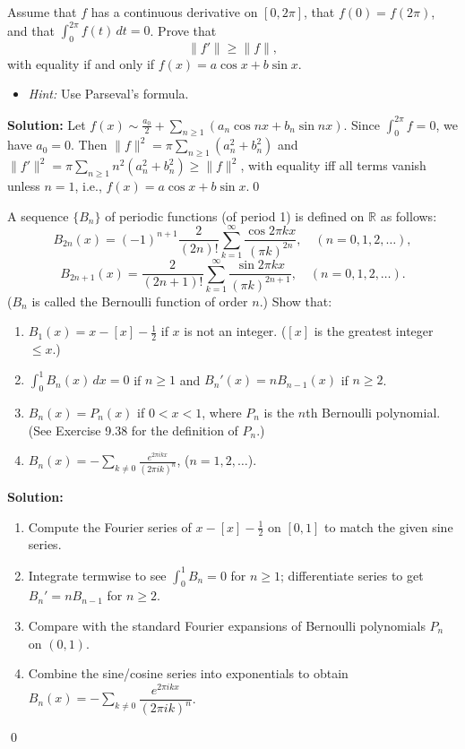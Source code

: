 \begin{problembox}
Assume that $f$ has a continuous derivative on $[0, 2\pi]$, that $f(0) = f(2\pi)$, and that $\int_0^{2\pi} f(t) \, dt = 0$. Prove that
\[
\|f'\| \geq \|f\|,
\]
with equality if and only if $f(x) = a \cos x + b \sin x$.
\begin{itemize}
\item \textit{Hint:} Use Parseval's formula.
\end{itemize}
\end{problembox}

\noindent\textbf{Solution:}
Let $f(x)\sim \tfrac{a_0}{2}+\sum_{n\ge1}(a_n\cos nx+b_n\sin nx)$. Since $\int_0^{2\pi}f=0$, we have $a_0=0$. Then $\|f\|^2=\pi\sum_{n\ge1}(a_n^2+b_n^2)$ and $\|f'\|^2=\pi\sum_{n\ge1} n^2(a_n^2+b_n^2)\ge\|f\|^2$, with equality iff all terms vanish unless $n=1$, i.e., $f(x)=a\cos x+b\sin x$.\qed


\begin{problembox}
A sequence $\{B_n\}$ of periodic functions (of period 1) is defined on $\mathbb{R}$ as follows:
\[
B_{2n}(x) = (-1)^{n+1} \frac{2}{(2n)!} \sum_{k=1}^\infty \frac{\cos 2\pi k x}{(\pi k)^{2n}}, \quad (n = 0, 1, 2, \dots),
\]
\[
B_{2n+1}(x) = \frac{2}{(2n + 1)!} \sum_{k=1}^\infty \frac{\sin 2\pi k x}{(\pi k)^{2n+1}}, \quad (n = 0, 1, 2, \dots).
\]
($B_n$ is called the Bernoulli function of order $n$.) Show that:
\begin{enumerate}[label=(\alph*)]
\item $B_1(x) = x - [x] - \frac{1}{2}$ if $x$ is not an integer. ($[x]$ is the greatest integer $\leq x$.)
\item $\int_0^1 B_n(x) \, dx = 0$ if $n \geq 1$ and $B_n'(x) = n B_{n-1}(x)$ if $n \geq 2$.
\item $B_n(x) = P_n(x)$ if $0 < x < 1$, where $P_n$ is the $n$th Bernoulli polynomial. (See Exercise 9.38 for the definition of $P_n$.)
\item $B_n(x) = -\sum_{k \neq 0} \frac{e^{2\pi i k x}}{(2\pi i k)^n}$, ($n = 1, 2, \dots$).
\end{enumerate}
\end{problembox}

\noindent\textbf{Solution:}
\begin{enumerate}[label=(\alph*)]
\item Compute the Fourier series of $x-[x]-\tfrac12$ on $[0,1]$ to match the given sine series.
\item Integrate termwise to see $\int_0^1 B_n=0$ for $n\ge1$; differentiate series to get $B_n'=nB_{n-1}$ for $n\ge2$.
\item Compare with the standard Fourier expansions of Bernoulli polynomials $P_n$ on $(0,1)$.
\item Combine the sine/cosine series into exponentials to obtain $B_n(x)=-\sum_{k\ne0}\dfrac{e^{2\pi i k x}}{(2\pi i k)^n}$.
\end{enumerate}\qed


